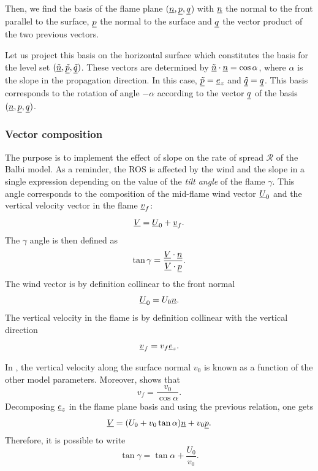 \smallskip

Then, we find the basis of the flame plane $(\underline{n}, \underline{p}, \underline{q}$) with $\underline{n}$ the normal to the front parallel to the surface, $\underline{p}$ the normal to the surface and $\underline{q}$ the vector product of the two previous vectors.

\smallskip

Let us project this basis on the horizontal surface which constitutes the basis for the level set $(\underline{\tilde n}, \underline{\tilde p}, \underline{\tilde q})$. These vectors are determined by $\underline{\tilde n} \cdot \underline{n} = \cos \alpha$, where $\alpha$ is the slope in the propagation direction. In this case, $\underline{\tilde p} = \underline{e}_z$ and $\underline{\tilde q} = \underline{q}$. This basis corresponds to the rotation of angle $- \alpha$ according to the vector $\underline{q}$ of the basis $(\underline{n}, \underline{p}, \underline{q})$.

\subsubsection{Vector composition}

The purpose is to implement the effect of slope on the rate of spread $\mathcal R$ of the Balbi model.
As a reminder, the ROS is affected by the wind and the slope in a single expression depending on the value of the \textit{tilt angle} of the flame $\gamma$.
This angle corresponds to the composition of the mid-flame wind vector $\underline{U}_0$ and the vertical velocity vector in the flame $\underline{v}_f$:
\begin{equation}
  \underline{V} = \underline{U}_0 + \underline{v}_f.
\end{equation}
The $\gamma$ angle is then defined as
\begin{equation}
  \tan \gamma = \frac{\underline{V} \cdot \underline{n}}{\underline{V} \cdot \underline{p}}.
\end{equation}
The wind vector is by definition collinear to the front normal
\begin{equation}
  \underline{U}_0 = U_0 \underline{n}.
\end{equation}
The vertical velocity in the flame is by definition collinear with the vertical direction
\begin{equation}
  \underline{v}_f = v_f \underline{e}_z.
\end{equation}

In \citep{Santoni2011}, the vertical velocity along the surface normal $v_0$ is known as a function of the other model parameters.
Moreover, \cite{Santoni2011} shows that
\begin{equation}
  v_f = \frac{v_0}{\cos \alpha}. 
\end{equation}
Decomposing $\underline{e}_z$ in the flame plane basis and using the previous relation, one gets 
\begin{equation}
  \underline{V} = (U_0 + v_0 \tan \alpha) \underline{n} + v_0 \underline{p}.
\end{equation}
Therefore, it is possible to write 
\begin{equation}
  \tan \gamma = \tan \alpha + \frac{U_0}{v_0}.
  \label{eq:tangamma}
\end{equation}

